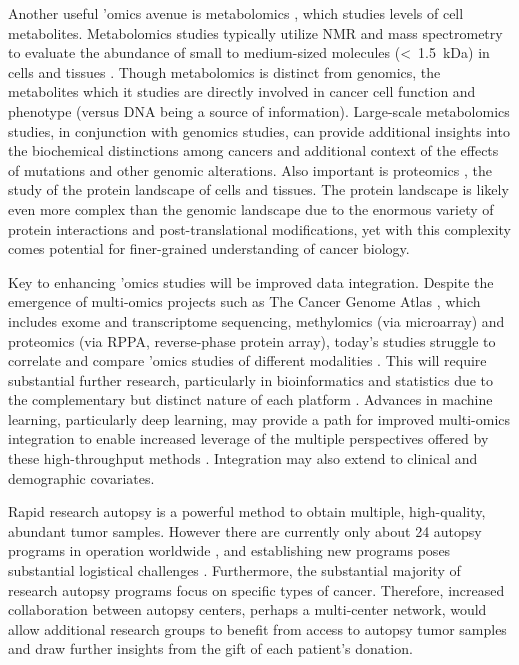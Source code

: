 Another useful 'omics avenue is metabolomics \cite{li2017}, which studies levels of cell metabolites. Metabolomics studies typically utilize NMR and mass spectrometry to evaluate the abundance of small to medium-sized molecules (\textless{}~1.5~kDa) in cells and tissues \cite{wishart2007}. Though metabolomics is distinct from genomics, the metabolites which it studies are directly involved in cancer cell function and phenotype (versus DNA being a source of information). Large-scale metabolomics studies, in conjunction with genomics studies, can provide additional insights into the biochemical distinctions among cancers and additional context of the effects of mutations and other genomic alterations. Also important is proteomics \cite{aslam2017}, the study of the protein landscape of cells and tissues. The protein landscape is likely even more complex than the genomic landscape due to the enormous variety of protein interactions and post-translational modifications, yet with this complexity comes potential for finer-grained understanding of cancer biology.

Key to enhancing 'omics studies will be improved data integration. Despite the emergence of multi-omics projects such as The Cancer Genome Atlas \cite{tcgageneric}, which includes exome and transcriptome sequencing, methylomics (via microarray) and proteomics (via RPPA, reverse-phase protein array), today's studies struggle to correlate and compare 'omics studies of different modalities \cite{ulfenborg2019}. This will require substantial further research, particularly in bioinformatics and statistics due to the complementary but distinct nature of each platform \cite{subramanian2020}. Advances in machine learning, particularly deep learning, may provide a path for improved multi-omics integration to enable increased leverage of the multiple perspectives offered by these high-throughput methods \cite{nicora2020}. Integration may also extend to clinical and demographic covariates.

Rapid research autopsy is a powerful method to obtain multiple, high-quality, abundant tumor samples. However there are currently only about 24 autopsy programs in operation worldwide \cite{robb2021}, and establishing new programs poses substantial logistical challenges \cite{bacon2020}. Furthermore, the substantial majority of research autopsy programs focus on specific types of cancer. Therefore, increased collaboration between autopsy centers, perhaps a multi-center network, would allow additional research groups to benefit from access to autopsy tumor samples and draw further insights from the gift of each patient's donation.

